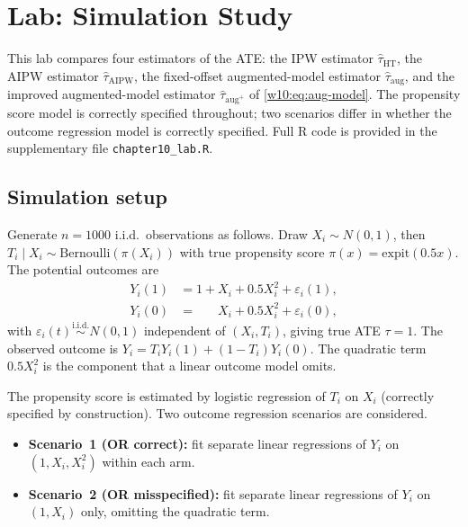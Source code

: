 \documentclass[master.tex]{subfiles}
\begin{document}
\section{Lab: Simulation Study}
\label{w10:sec:lab}

This lab compares four estimators of the ATE: the IPW estimator
$\hat\tau_{\mathrm{HT}}$, the AIPW estimator $\hat\tau_{\mathrm{AIPW}}$,
the fixed-offset augmented-model estimator $\hat\tau_{\mathrm{aug}}$,
and the improved augmented-model estimator $\hat\tau_{\mathrm{aug}^+}$
of \eqref{w10:eq:aug-model}.  The propensity score model is correctly
specified throughout; two scenarios differ in whether the outcome
regression model is correctly specified.  Full \textsf{R} code is
provided in the supplementary file \texttt{chapter10\_lab.R}.

\subsection{Simulation setup}
\label{w10:subsec:lab-setup}

Generate $n = 1000$ i.i.d.\ observations as follows.  Draw
$X_i \sim N(0,1)$, then $T_i \mid X_i \sim
\mathrm{Bernoulli}(\pi(X_i))$ with true propensity score
$\pi(x) = \mathrm{expit}(0.5x)$.  The potential outcomes are
\begin{align*}
  Y_i(1) &= 1 + X_i + 0.5X_i^2 + \varepsilon_i(1), \\
  Y_i(0) &= \phantom{1 +{}} X_i + 0.5X_i^2 + \varepsilon_i(0),
\end{align*}
with $\varepsilon_i(t) \overset{\mathrm{i.i.d.}}{\sim} N(0,1)$
independent of $(X_i, T_i)$, giving true ATE $\tau = 1$.  The
observed outcome is $Y_i = T_i Y_i(1) + (1-T_i)Y_i(0)$.  The
quadratic term $0.5X_i^2$ is the component that a linear outcome
model omits.

The propensity score is estimated by logistic regression of $T_i$
on $X_i$ (correctly specified by construction).  Two outcome
regression scenarios are considered.
\begin{itemize}
  \item \textbf{Scenario~1 (OR correct):} fit separate linear
    regressions of $Y_i$ on $(1, X_i, X_i^2)$ within each arm.
  \item \textbf{Scenario~2 (OR misspecified):} fit separate linear
    regressions of $Y_i$ on $(1, X_i)$ only, omitting the quadratic
    term.
\end{itemize}
\end{document}
